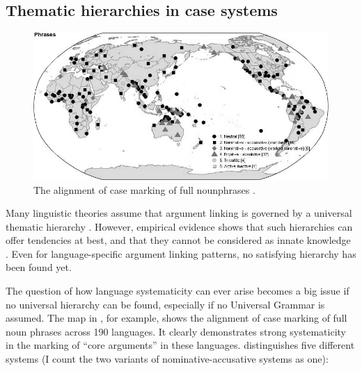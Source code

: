 \subsection{Thematic hierarchies in case systems}
\label{s:comp-thematic}

\begin{figure}[t]
\centerline{\includegraphics[width=\textwidth]{Chapter5/figs/wals.jpg}}
  \caption[Alignment of case marking of full noun phrases \citep{comrie05wals}]{The alignment of case marking of full nounphrases \citep[98]{comrie05wals}.}
   \label{f:wals}
\end{figure}

Many linguistic theories assume that argument linking is governed by a universal thematic hierarchy \citep[e.g.][]{dik97functional, fillmore68case, givon01syntax, jackendoff90semantic, keenan77noun}. However, empirical evidence shows that such hierarchies can offer tendencies at best, and that they cannot be considered as innate knowledge \citep{levin05argument}. Even for language-specific argument linking patterns, no satisfying hierarchy has been found yet.

The question of how language systematicity can ever arise becomes a big issue if no universal hierarchy can be found, especially if no Universal Grammar is assumed. The map in , for example, shows the alignment of case marking of full noun phrases across 190 languages. It clearly demonstrates strong systematicity in the marking of ``core arguments'' in these languages. \citet{comrie05wals} distinguishes five different systems (I count the two variants of nominative-accusative systems as one):

